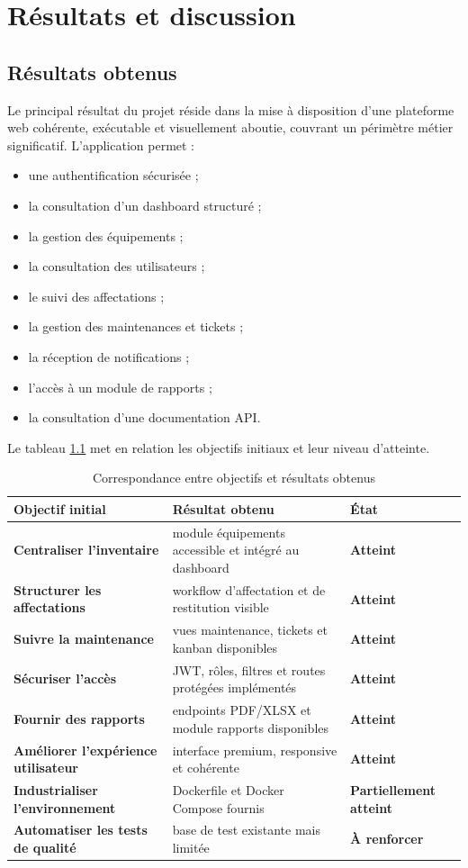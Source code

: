 ﻿\chapter{Résultats et discussion}
\label{chap:results}

\section{Résultats obtenus}
Le principal résultat du projet réside dans la mise à disposition d'une plateforme web cohérente, exécutable et visuellement aboutie, couvrant un périmètre métier significatif. L'application permet :
\begin{itemize}
  \item une authentification sécurisée ;
  \item la consultation d'un dashboard structuré ;
  \item la gestion des équipements ;
  \item la consultation des utilisateurs ;
  \item le suivi des affectations ;
  \item la gestion des maintenances et tickets ;
  \item la réception de notifications ;
  \item l'accès à un module de rapports ;
  \item la consultation d'une documentation API.
\end{itemize}

Le tableau \ref{tab:resultats-objectifs} met en relation les objectifs initiaux et leur niveau d'atteinte.

\begin{table}[H]
\centering
\caption{Correspondance entre objectifs et résultats obtenus}
\label{tab:resultats-objectifs}
\begin{tabularx}{\textwidth}{>{\bfseries}p{4.6cm}X>{\bfseries}p{2cm}}
\toprule
Objectif initial & Résultat obtenu & État \\
\midrule
Centraliser l'inventaire & module équipements accessible et intégré au dashboard & Atteint \\
Structurer les affectations & workflow d'affectation et de restitution visible & Atteint \\
Suivre la maintenance & vues maintenance, tickets et kanban disponibles & Atteint \\
Sécuriser l'accès & JWT, rôles, filtres et routes protégées implémentés & Atteint \\
Fournir des rapports & endpoints PDF/XLSX et module rapports disponibles & Atteint \\
Améliorer l'expérience utilisateur & interface premium, responsive et cohérente & Atteint \\
Industrialiser l'environnement & Dockerfile et Docker Compose fournis & Partiellement atteint \\
Automatiser les tests de qualité & base de test existante mais limitée & À renforcer \\
\bottomrule
\end{tabularx}
\end{table}

